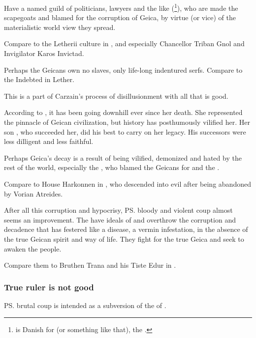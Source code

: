 Have a named guild of politicians, lawyers and the like (\footnote{\quo{\DJOF} is Danish for  (or something like that), the .}), who are made the scapegoats and blamed for the corruption of Geica, by virtue (or vice) of the materialistic world view they spread. 

Compare to the Letherii culture in \cite{StevenEriksonIanCameronEsslemont:MalazanBookoftheFallen}, and especially Chancellor Triban Gnol and Invigilator Karos Invictad. 

Perhaps the Geicans own no slaves, only life-long indentured serfs. Compare to the Indebted in Lether. 

This is a part of Carzain's process of disillusionment with all that is good. 

According to \Belzir, it has been going downhill ever since her death. She represented the pinnacle of Geican civilization, but history has posthumously vilified her. Her son , who succeeded her, did his best to carry on her legacy. His successors were less dilligent and less faithful. 

Perhaps Geica's decay is a result of being vilified, demonized and hated by the rest of the world, especially the , who blamed the Geicans for \Belzir{} and the . 

Compare to House Harkonnen in , who descended into evil after being abandoned by Vorian Atreides. 

After all this corruption and hypocrisy, \ps{\Belzir}{} bloody and violent coup almost seems an improvement. The  have ideals of  and overthrow the corruption and decadence that has festered like a disease, a vermin infestation, in the absence of the true Geican spirit and way of life. They fight for the true Geica and seek to awaken the people. 

Compare them to Bruthen Trana and his Tiste Edur in \MalazanReapersGale. 





\subsubsection{True ruler is not good}
\ps{\Belzir} brutal coup is intended as a subversion of the \cliche{} of . 





